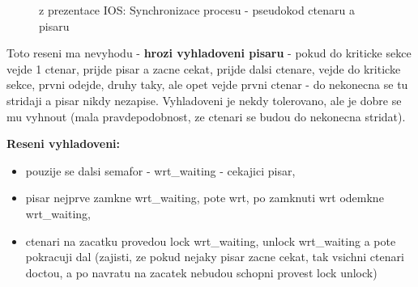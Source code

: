 \documentclass[a4paper, 11pt]{article}
\begin{document}
\begin{figure} [ht]
    \centering
    \caption{z prezentace IOS: Synchronizace procesu - pseudokod ctenaru a pisaru}
\end{figure}

Toto reseni ma nevyhodu - \textbf{hrozi vyhladoveni pisaru} - pokud do kriticke sekce vejde 1 ctenar, prijde pisar a zacne cekat, prijde dalsi ctenare, vejde do kriticke sekce, prvni odejde, druhy taky, ale opet vejde prvni ctenar - do nekonecna se tu stridaji a pisar nikdy nezapise. Vyhladoveni je nekdy tolerovano, ale je dobre se mu vyhnout (mala pravdepodobnost, ze ctenari se budou do nekonecna stridat).

\textbf{Reseni vyhladoveni:}
\begin{itemize}
    \item pouzije se dalsi semafor - wrt\_waiting - cekajici pisar,
    \item pisar nejprve zamkne wrt\_waiting, pote wrt, po zamknuti wrt odemkne wrt\_waiting,
    \item ctenari na zacatku provedou lock wrt\_waiting, unlock wrt\_waiting a pote pokracuji dal (zajisti, ze pokud nejaky pisar zacne cekat, tak vsichni ctenari doctou, a po navratu na zacatek nebudou schopni provest lock unlock) \\
\end{itemize}

\newpage
\end{document}
